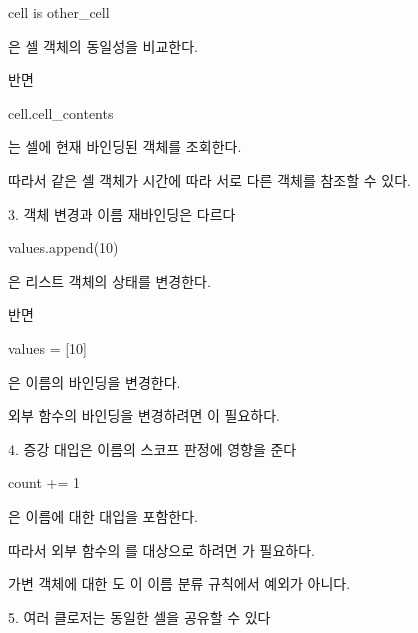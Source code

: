 \begin{dhkcode}
cell is other_cell
\end{dhkcode}

은 셀 객체의 동일성을 비교한다.

반면

\begin{dhkcode}
cell.cell_contents
\end{dhkcode}

는 셀에 현재 바인딩된 객체를 조회한다.

따라서 같은 셀 객체가 시간에 따라 서로 다른 객체를 참조할 수 있다.

\begin{dhknote}
\begin{dhksmry}[centered]
3. 객체 변경과 이름 재바인딩은 다르다
\end{dhksmry}
\end{dhknote}

\begin{dhkcode}
values.append(10)
\end{dhkcode}

은 리스트 객체의 상태를 변경한다.

반면

\begin{dhkcode}
values = [10]
\end{dhkcode}

은 이름의 바인딩을 변경한다.

외부 함수의 바인딩을 변경하려면 이 필요하다.

\begin{dhknote}
\begin{dhksmry}[centered]
4. 증강 대입은 이름의 스코프 판정에 영향을 준다
\end{dhksmry}
\end{dhknote}

\begin{dhkcode}
count += 1
\end{dhkcode}

은 이름에 대한 대입을 포함한다.

따라서 외부 함수의 를 대상으로 하려면 가 필요하다.

가변 객체에 대한 \zsh{+=}도 이 이름 분류 규칙에서 예외가 아니다.

\begin{dhknote}
\begin{dhksmry}[centered]
5. 여러 클로저는 동일한 셀을 공유할 수 있다
\end{dhksmry}
\end{dhknote}

